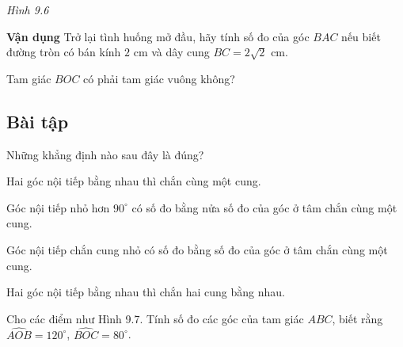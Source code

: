 \begin{lesson}
\begin{center}
    \textit{Hình 9.6}
    \end{center}

    \answerline
    \answerline
    \answerline

    \textbf{Vận dụng} Trở lại tình huống mở đầu, hãy tính số đo của góc $BAC$ nếu biết đường tròn có bán kính $2$ cm và dây cung $BC=2\sqrt{2}$ cm.

    Tam giác $BOC$ có phải tam giác vuông không?

    \answerline
    \answerline
\end{lesson}

\begin{exercises}
    \subsection{Bài tập}

    \begin{questions}[series=SGK]
        \item Những khẳng định nào sau đây là đúng?
        \begin{questions}
            \item Hai góc nội tiếp bằng nhau thì chắn cùng một cung.
            \item Góc nội tiếp nhỏ hơn $90^\circ$ có số đo bằng nửa số đo của góc ở tâm chắn cùng một cung.
            \item Góc nội tiếp chắn cung nhỏ có số đo bằng số đo của góc ở tâm chắn cùng một cung.
            \item Hai góc nội tiếp bằng nhau thì chắn hai cung bằng nhau.
        \end{questions}

        \answerline

        \item Cho các điểm như Hình 9.7. Tính số đo các góc của tam giác $ABC$, biết rằng $\widehat{AOB}=120^\circ$, $\widehat{BOC}=80^\circ$.

        \begin{center}


\end{center}
\end{questions}
\end{exercises}
